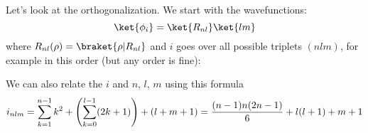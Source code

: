 Let's look at the orthogonalization. We start with the 
wavefunctions:
$$\ket{\phi_i}=\ket{R_{nl}}\ket{lm}$$
where $R_{nl}(\rho)=\braket{\rho|R_{nl}}$ and $i$ goes over all possible
triplets $(nlm)$, for example in this order (but any order is fine):

\vbox{\hfil\vbox{
}\hfil}

We can also relate the $i$ and $n$, $l$, $m$ using this formula
$$i_{nlm}=\sum_{k=1}^{n-1}k^2+\left(\sum_{k=0}^{l-1} (2k+1)\right) + (l+m+1)=
{(n-1)n(2n-1)\over6} + l(l+1)+m+1$$


